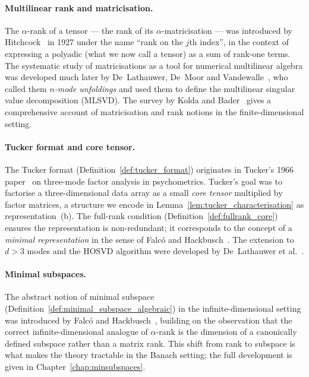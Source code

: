 \paragraph{Multilinear rank and matricisation.}
The $\alpha$-rank of a tensor — the rank of its $\alpha$-matricisation —
was introduced by Hitchcock~\cite{Hitchcock1927} in 1927 under the name
``rank on the $j$th index'', in the context of expressing a polyadic
(what we now call a tensor) as a sum of rank-one terms. The systematic
study of matricisations as a tool for numerical multilinear algebra was
developed much later by De~Lathauwer, De~Moor and
Vandewalle~\cite{DeLathauwer2000}, who called them \emph{$n$-mode
unfoldings} and used them to define the multilinear singular value
decomposition (MLSVD). The survey by Kolda and Bader~\cite{KoldaBader2009}
gives a comprehensive account of matricisation and rank notions in the
finite-dimensional setting.

\paragraph{Tucker format and core tensor.}
The Tucker format (Definition~\ref{def:tucker_format}) originates in
Tucker's 1966 paper~\cite{Tucker1966} on three-mode factor analysis in
psychometrics. Tucker's goal was to factorise a three-dimensional data
array as a small \emph{core tensor} multiplied by factor matrices, a
structure we encode in Lemma~\ref{lem:tucker_characterisation} as
representation~(b). The full-rank condition
(Definition~\ref{def:fullrank_core}) ensures the representation is
non-redundant; it corresponds to the concept of a
\emph{minimal representation} in the sense of Falcó and
Hackbusch~\cite{FH2012}. The extension to $d > 3$ modes and the
HOSVD algorithm were developed by De~Lathauwer et al.\
\cite{DeLathauwer2000}.

\paragraph{Minimal subspaces.}
The abstract notion of minimal subspace
(Definition~\ref{def:minimal_subspace_algebraic}) in the infinite-dimensional
setting was introduced by Falcó and Hackbusch~\cite{FH2012}, building
on the observation that the correct infinite-dimensional analogue of
$\alpha$-rank is the dimension of a canonically defined subspace rather
than a matrix rank. This shift from rank to subspace is what makes the
theory tractable in the Banach setting; the full development is given
in Chapter~\ref{chap:minsubspaces}.

